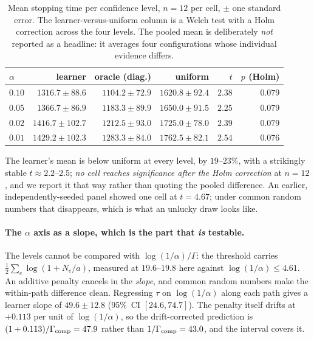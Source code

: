 \begin{table}[t]
\caption{Mean stopping time per confidence level, $n=12$ per cell, $\pm$ one standard
error. The learner-versus-uniform column is a Welch test with a Holm correction across the
four levels. The pooled mean is deliberately \emph{not} reported as a headline: it averages
four configurations whose individual evidence differs.}
\label{tab:panel}
\centering
\footnotesize
\begin{tabular}{@{}lrrrrr@{}}
\toprule
$\alpha$ & learner & oracle (diag.) & uniform & $t$ & $p$ (Holm) \\
\midrule
$0.10$ & $1316.7\pm88.6$ & $1104.2\pm72.9$ & $1620.8\pm92.4$ & $2.38$ & $0.079$ \\
$0.05$ & $1366.7\pm86.9$ & $1183.3\pm89.9$ & $1650.0\pm91.5$ & $2.25$ & $0.079$ \\
$0.02$ & $1416.7\pm102.7$ & $1212.5\pm93.0$ & $1725.0\pm78.0$ & $2.39$ & $0.079$ \\
$0.01$ & $1429.2\pm102.3$ & $1283.3\pm84.0$ & $1762.5\pm82.1$ & $2.54$ & $0.076$ \\
\bottomrule
\end{tabular}
\end{table}

The learner's mean is below uniform at every level, by $19$--$23\%$, with a strikingly
stable $t\approx2.2$--$2.5$; \emph{no cell reaches significance after the Holm
correction} at $n=12$, and we report it that way rather than quoting the pooled difference.
An earlier, independently-seeded panel showed one cell at $t=4.67$; under common random
numbers that disappears, which is what an unlucky draw looks like.

\paragraph{The $\alpha$ axis as a slope, which is the part that \emph{is} testable.}
The levels cannot be compared with $\log(1/\alpha)/\Gamma$: the threshold carries
$\tfrac12\sum_{e}\log(1+N_{e}/a)$, measured at $19.6$--$19.8$ here against
$\log(1/\alpha)\le4.61$. An additive penalty cancels in the \emph{slope}, and common
random numbers make the within-path difference clean. Regressing $\tau$ on
$\log(1/\alpha)$ along each path gives a learner slope of $49.6\pm12.8$
(95\%\ CI $[24.6,74.7]$). The penalty itself drifts at $+0.113$ per unit of
$\log(1/\alpha)$, so the drift-corrected prediction is $(1+0.113)/\Gamma_{\rm comp}=47.9$
rather than $1/\Gamma_{\rm comp}=43.0$, and the interval covers it. \NUM{}

